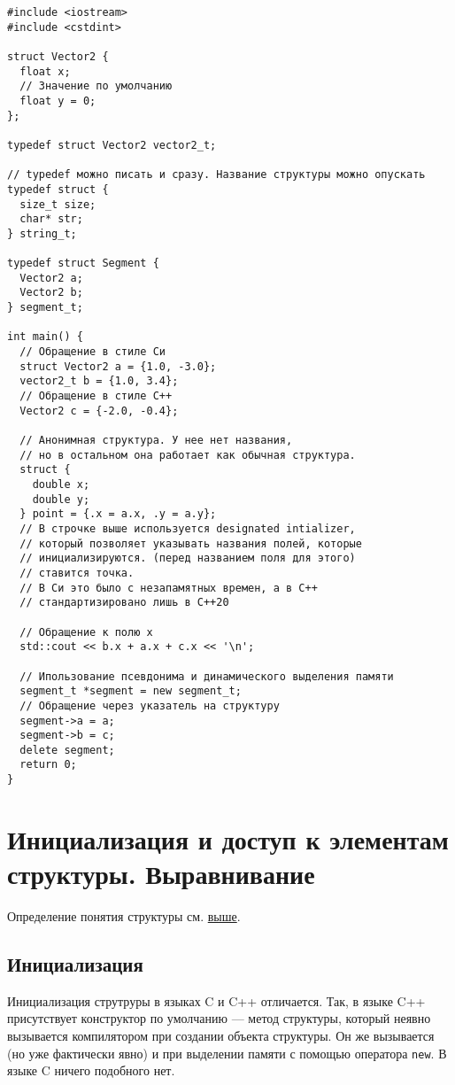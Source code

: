 \documentclass[14pt, a4paper]{extarticle}
\begin{document}
\begin{verbatim}
#include <iostream>
#include <cstdint>

struct Vector2 {
  float x;
  // Значение по умолчанию
  float y = 0;
};

typedef struct Vector2 vector2_t;

// typedef можно писать и сразу. Название структуры можно опускать
typedef struct {
  size_t size;
  char* str;
} string_t;

typedef struct Segment {
  Vector2 a;
  Vector2 b;
} segment_t;

int main() {
  // Обращение в стиле Си
  struct Vector2 a = {1.0, -3.0};
  vector2_t b = {1.0, 3.4};
  // Обращение в стиле C++
  Vector2 c = {-2.0, -0.4};

  // Анонимная структура. У нее нет названия,
  // но в остальном она работает как обычная структура.
  struct {
    double x;
    double y;
  } point = {.x = a.x, .y = a.y};
  // В строчке выше используется designated intializer,
  // который позволяет указывать названия полей, которые
  // инициализируются. (перед названием поля для этого)
  // ставится точка.
  // В Си это было с незапамятных времен, а в C++
  // стандартизировано лишь в C++20

  // Обращение к полю x
  std::cout << b.x + a.x + c.x << '\n';
  
  // Ипользование псевдонима и динамического выделения памяти
  segment_t *segment = new segment_t;
  // Обращение через указатель на структуру
  segment->a = a;
  segment->b = c;
  delete segment;
  return 0;
}
\end{verbatim}

\section{Инициализация и доступ к элементам структуры. Выравнивание}
Определение понятия структуры см. \hyperref[def:struct]{выше}.

\subsection*{Инициализация}

Инициализация струтруры в языках C и C++ отличается. Так, в языке C++
присутствует конструктор по умолчанию --- метод структуры, который неявно
вызывается компилятором при создании объекта структуры. Он же вызывается (но
уже фактически явно) и при выделении памяти с помощью оператора \verb|new|.
В языке C ничего подобного нет.
\end{document}
